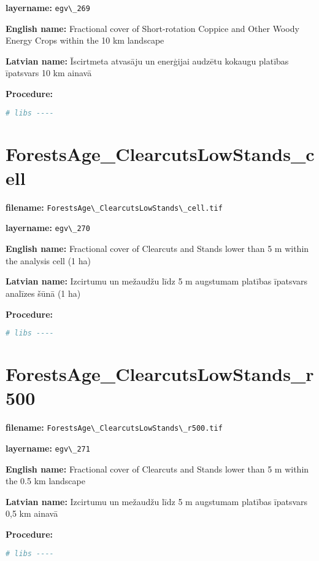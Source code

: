\documentclass[
]{book}
\newcommand{\passthrough}[1]{#1}
\begin{document}
\textbf{layername:} \passthrough{\lstinline!egv\_269!}

\textbf{English name:} Fractional cover of Short-rotation Coppice and Other Woody Energy Crops within the 10 km landscape

\textbf{Latvian name:} Īscirtmeta atvasāju un enerģijai audzētu kokaugu platības īpatsvars 10 km ainavā

\textbf{Procedure:}

\begin{lstlisting}[language=R]
# libs ----
\end{lstlisting}

\section{ForestsAge\_ClearcutsLowStands\_cell}\label{ch06.270}

\textbf{filename:} \passthrough{\lstinline!ForestsAge\_ClearcutsLowStands\_cell.tif!}

\textbf{layername:} \passthrough{\lstinline!egv\_270!}

\textbf{English name:} Fractional cover of Clearcuts and Stands lower than 5 m within the analysis cell (1 ha)

\textbf{Latvian name:} Izcirtumu un mežaudžu līdz 5 m augstumam platības īpatsvars analīzes šūnā (1 ha)

\textbf{Procedure:}

\begin{lstlisting}[language=R]
# libs ----
\end{lstlisting}

\section{ForestsAge\_ClearcutsLowStands\_r500}\label{ch06.271}

\textbf{filename:} \passthrough{\lstinline!ForestsAge\_ClearcutsLowStands\_r500.tif!}

\textbf{layername:} \passthrough{\lstinline!egv\_271!}

\textbf{English name:} Fractional cover of Clearcuts and Stands lower than 5 m within the 0.5 km landscape

\textbf{Latvian name:} Izcirtumu un mežaudžu līdz 5 m augstumam platības īpatsvars 0,5 km ainavā

\textbf{Procedure:}

\begin{lstlisting}[language=R]
# libs ----
\end{lstlisting}
\end{document}
